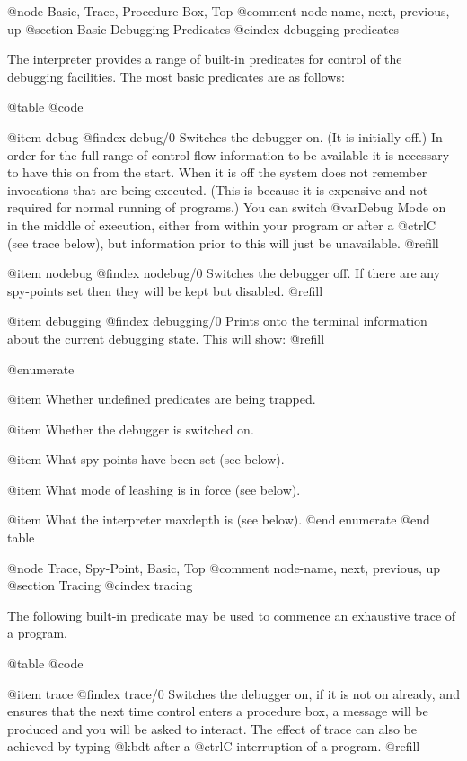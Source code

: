 @node Basic, Trace, Procedure Box, Top
@comment  node-name,  next,  previous,  up
@section Basic Debugging Predicates
@cindex debugging predicates

The interpreter provides a range of built-in predicates for control of the
debugging facilities.  The most basic predicates are as follows:

@table @code

@item debug
@findex debug/0
Switches the debugger on.  (It is initially off.)  In order for the
full range of control flow information to be available it is necessary to
have this on from the start.  When it is off the system does not remember
invocations that are being executed.  (This is because it is expensive and
not required for normal running of programs.)  You can switch @var{Debug
Mode} on in the middle of execution, either from within your program or
after a @ctrl{C} (see trace below), but information prior to this will just
be unavailable. @refill

@item nodebug
@findex nodebug/0
Switches the debugger off.  If there are any spy-points set then they
will be kept but disabled. @refill

@item debugging
@findex debugging/0
Prints onto the terminal information about the current debugging state.
This will show: @refill

@enumerate

@item
Whether undefined predicates are being trapped.

@item
Whether the debugger is switched on.

@item
What spy-points have been set (see below).

@item
What mode of leashing is in force (see below).

@item
What the interpreter maxdepth is (see below).
@end enumerate
@end table

@node Trace, Spy-Point, Basic, Top
@comment  node-name,  next,  previous,  up
@section Tracing
@cindex tracing

The following built-in predicate may be used to commence an exhaustive
trace of a program.

@table @code

@item trace
@findex trace/0
Switches the debugger on, if it is not on already, and ensures that the
next time control enters a procedure box, a message will be produced and
you will be asked to interact.  The effect of trace can also be achieved
by typing @kbd{t} after a @ctrl{C} interruption of a program. @refill

